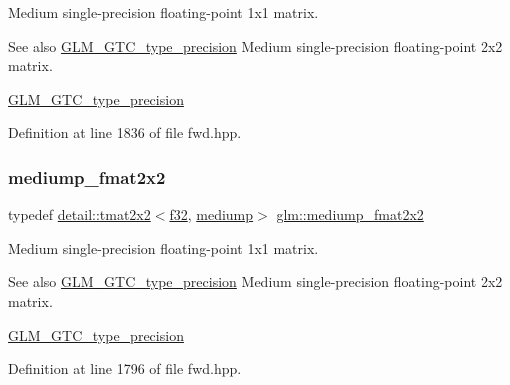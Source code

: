 Medium single-\/precision floating-\/point 1x1 matrix. \begin{DoxySeeAlso}{See also}
\hyperlink{group__gtc__type__precision}{G\+L\+M\+\_\+\+G\+T\+C\+\_\+type\+\_\+precision} Medium single-\/precision floating-\/point 2x2 matrix. 

\hyperlink{group__gtc__type__precision}{G\+L\+M\+\_\+\+G\+T\+C\+\_\+type\+\_\+precision} 
\end{DoxySeeAlso}


Definition at line 1836 of file fwd.\+hpp.

\mbox{\label{group__gtc__type__precision_gae9af1d96efbaeeb5c5edd9c7b0a24fa5}} 
\subsubsection{\texorpdfstring{mediump\+\_\+fmat2x2}{mediump\_fmat2x2}}
{\footnotesize\ttfamily typedef \hyperlink{structglm_1_1detail_1_1tmat2x2}{detail\+::tmat2x2}$<$\hyperlink{group__gtc__type__precision_ga0ec999b57f5330d9021256e96038df04}{f32}, \hyperlink{namespaceglm_a0f04f086094c747d227af4425893f545a6416f3ea0c9025fb21ed50c4d6620482}{mediump}$>$ \hyperlink{group__gtc__type__precision_gae9af1d96efbaeeb5c5edd9c7b0a24fa5}{glm\+::mediump\+\_\+fmat2x2}}

Medium single-\/precision floating-\/point 1x1 matrix. \begin{DoxySeeAlso}{See also}
\hyperlink{group__gtc__type__precision}{G\+L\+M\+\_\+\+G\+T\+C\+\_\+type\+\_\+precision} Medium single-\/precision floating-\/point 2x2 matrix. 

\hyperlink{group__gtc__type__precision}{G\+L\+M\+\_\+\+G\+T\+C\+\_\+type\+\_\+precision} 
\end{DoxySeeAlso}


Definition at line 1796 of file fwd.\+hpp.

\mbox{\label{group__gtc__type__precision_gaae7081e19f495e7cdbf727e1550b95a8}} 
